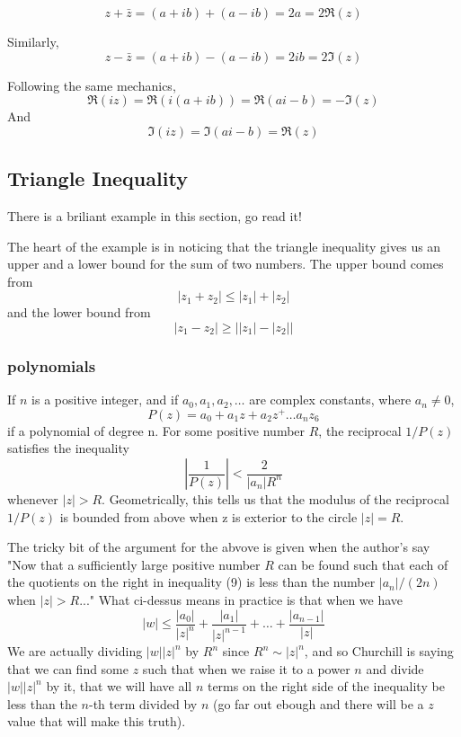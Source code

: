 $$
z + \bar{z} = (a+ib) + (a-ib) = 2a = 2\Re (z)
$$

Similarly,
$$
z - \bar{z} = (a+ib) - (a-ib) = 2ib = 2\Im (z)
$$

Following the same mechanics,
$$
\Re (iz) = \Re (i(a+ib)) = \Re (ai-b) = -\Im (z)
$$
And
$$
\Im (iz) = \Im (ai -b) = \Re (z)
$$


\subsection{Triangle Inequality}

There is a briliant example in this section, go read it!

The heart of the example is in noticing that the triangle inequality gives us an upper and a lower
bound for the sum of two numbers.
The upper bound comes from
$$
|z_1 + z_2| \leq |z_1| + |z_2|
$$
and the lower bound from
$$
|z_1 - z_2| \geq \left| |z_1| - |z_2| \right|
$$

\subsubsection{polynomials}

If $n$ is a positive integer, and if $a_0, a_1, a_2, \ldots$ are complex constants,
where $a_n \neq 0$,
$$
P(z) = a_0 + a_1 z + a_2 z^ + \ldots a_n z_6
$$
if a polynomial of degree n.
For some positive number $R$, the reciprocal $1/P(z)$ satisfies the inequality
$$
\left| \frac{1}{P(z)} \right| < \frac{2}{|a_n| R^n}
$$
whenever $|z| > R$.
Geometrically, this tells us that the modulus of the reciprocal $1/P(z)$
is bounded from above when z is exterior to the circle $|z| = R$.

The tricky bit of the argument for the abvove is given when the author's say
"Now that a sufficiently large positive number $R$ can be found such that each of the
quotients on the right in inequality (9) is less than the number $|a_n |/(2n)$ when
$|z| > R$..."
What ci-dessus means in practice is that when we have
$$
|w| \leq \frac{|a_0|}{|z|^n} + \frac{|a_1|}{|z|^{n-1}} + \ldots + \frac{|a_{n-1}|}{|z|}
$$
We are actually dividing $|w||z|^n$ by $R^n$ since $R^n \sim |z|^n$, and so Churchill
is saying that we can find some $z$ such that when we raise it to a power $n$ and divide $|w||z|^n$
by it, that we will have all $n$ terms on the right side of the inequality be less than the $n$-th
term divided by $n$ (go far out ebough and there will be a $z$ value that will make this truth).

